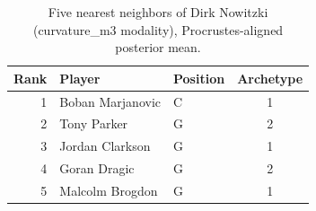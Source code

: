\begin{table}[htbp]
  \centering\small
  \begin{tabular}{rllc}
    \toprule
    Rank & Player & Position & Archetype \\
    \midrule
    1 & Boban Marjanovic & C & 1 \\
    2 & Tony Parker & G & 2 \\
    3 & Jordan Clarkson & G & 1 \\
    4 & Goran Dragic & G & 2 \\
    5 & Malcolm Brogdon & G & 1 \\
    \bottomrule
  \end{tabular}
  \caption{Five nearest neighbors of Dirk Nowitzki (curvature_m3 modality), Procrustes-aligned posterior mean.}
  \label{tab:Dirk_Nowitzki_neighbors_curvature_m3}
\end{table}

